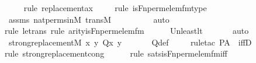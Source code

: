 \begin{isabellebody}
\ \ \ \ \isamarkupfalse%
{\isacharparenleft}{\kern0pt}rule\ replacement{\isacharunderscore}{\kern0pt}ax{\isacharparenright}{\kern0pt}\isanewline
\ \ \ \ \isamarkupfalse%
{\isacharparenleft}{\kern0pt}rule\ is{\isacharunderscore}{\kern0pt}Fn{\isacharunderscore}{\kern0pt}perm{\isacharunderscore}{\kern0pt}elem{\isacharunderscore}{\kern0pt}fm{\isacharunderscore}{\kern0pt}type{\isacharparenright}{\kern0pt}\isanewline
\ \ \ \ \isamarkupfalse%
\ assms\ nat{\isacharunderscore}{\kern0pt}perms{\isacharunderscore}{\kern0pt}in{\isacharunderscore}{\kern0pt}M\ transM\isanewline
\ \ \ \ \ \ \ \ \isamarkupfalse%
\ auto{\isacharbrackleft}{\kern0pt}{}{\isacharbrackright}{\kern0pt}\isanewline
\ \ \ \ \isamarkupfalse%
{\isacharparenleft}{\kern0pt}rule\ le{\isacharunderscore}{\kern0pt}trans{\isacharcomma}{\kern0pt}\ rule\ arity{\isacharunderscore}{\kern0pt}is{\isacharunderscore}{\kern0pt}Fn{\isacharunderscore}{\kern0pt}perm{\isacharunderscore}{\kern0pt}elem{\isacharunderscore}{\kern0pt}fm{\isacharparenright}{\kern0pt}\isanewline
\ \ \ \ \isamarkupfalse%
\ Un{\isacharunderscore}{\kern0pt}least{\isacharunderscore}{\kern0pt}lt\ \isanewline
\ \ \ \ \isamarkupfalse%
\ auto\isanewline
\ \ \isamarkupfalse%
\ {\isachardoublequoteopen}strong{\isacharunderscore}{\kern0pt}replacement{\isacharparenleft}{\kern0pt}{\isacharhash}{\kern0pt}{\isacharhash}{\kern0pt}M{\isacharcomma}{\kern0pt}\ {\isasymlambda}x\ y{\isachardot}{\kern0pt}\ Q{\isacharparenleft}{\kern0pt}x{\isacharcomma}{\kern0pt}\ y{\isacharparenright}{\kern0pt}{\isacharparenright}{\kern0pt}{\isachardoublequoteclose}\ \isanewline
\ \ \ \ \isamarkupfalse%
\ Q{\isacharunderscore}{\kern0pt}def\isanewline
\ \ \ \ \isamarkupfalse%
{\isacharparenleft}{\kern0pt}rule{\isacharunderscore}{\kern0pt}tac\ P{\isacharequal}{\kern0pt}{\isachardoublequoteopen}{\isacharquery}{\kern0pt}A{\isachardoublequoteclose}\ \ iffD{}{\isacharparenright}{\kern0pt}\isanewline
\ \ \ \ \ \isamarkupfalse%
{\isacharparenleft}{\kern0pt}rule\ strong{\isacharunderscore}{\kern0pt}replacement{\isacharunderscore}{\kern0pt}cong{\isacharparenright}{\kern0pt}\isanewline
\ \ \ \ \ \isamarkupfalse%
{\isacharparenleft}{\kern0pt}rule\ sats{\isacharunderscore}{\kern0pt}is{\isacharunderscore}{\kern0pt}Fn{\isacharunderscore}{\kern0pt}perm{\isacharunderscore}{\kern0pt}elem{\isacharunderscore}{\kern0pt}fm{\isacharunderscore}{\kern0pt}iff{\isacharparenright}{\kern0pt}\isanewline

\end{isabellebody}

